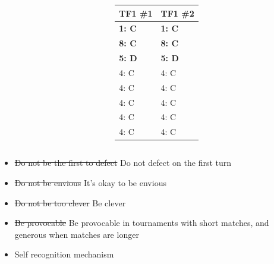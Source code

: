 \documentclass{beamer}
\begin{document}
\begin{frame}
    \begin{columns}
        \begin{column}{.6\textwidth}
            \begin{center}
                \scalebox{.49}{
                    
                }
            \end{center}
        \end{column}
        \begin{column}{.4\textwidth}
            \small
            \begin{tabular}{ll}
                \toprule
                TF1 \#1   & TF1 \#2\\
                \midrule
                \bf{1}: C & \bf{1}: C  \\
                \bf{8}: C & \bf{8}: C  \\
                \bf{5}: D & \bf{5}: D  \\
                4: C      & 4: C  \\
                4: C      & 4: C  \\
                4: C      & 4: C  \\
                4: C      & 4: C  \\
                4: C      & 4: C  \\
                \bottomrule
            \end{tabular}
        \end{column}
    \end{columns}
\end{frame}

\begin{frame}
    \begin{itemize}
    \item \st{Do not be the first to defect} Do not defect on the first turn
    \item \st{Do not be envious} It's okay to be envious 
    \item \st{Do not be too clever} Be clever
    \item \st{Be provocable} Be provocable in tournaments with short matches, and generous when matches are longer
    \item Self recognition mechanism
    \end{itemize}
\end{frame}
\end{document}
